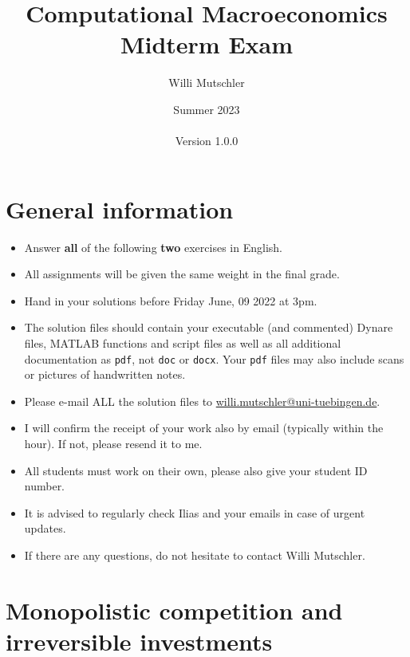 \documentclass{article}
\begin{document}
	
\title{Computational Macroeconomics\\Midterm Exam}
\author{Willi Mutschler}
\date{Summer 2023\\~\\Version 1.0.0}
\maketitle

\section*{General information}
\begin{itemize}
\item Answer \textbf{all} of the following \textbf{two} exercises in English.
\item All assignments will be given the same weight in the final grade.
\item Hand in your solutions before Friday June, 09 2022 at 3pm.
\item The solution files should contain your executable (and commented) Dynare files, MATLAB functions and script files
  as well as all additional documentation as \texttt{pdf}, not \texttt{doc} or \texttt{docx}.
Your \texttt{pdf} files may also include scans or pictures of handwritten notes.
\item Please e-mail ALL the solution files to \url{willi.mutschler@uni-tuebingen.de}.
\item I will confirm the receipt of your work also by email (typically within the hour). If not, please resend it to me.
\item All students must work on their own, please also give your student ID number.
\item It is advised to regularly check Ilias and your emails in case of urgent updates.
\item If there are any questions, do not hesitate to contact Willi Mutschler.
\end{itemize}


\newpage

\section[Monopolistic competition and irreversible investments]{Monopolistic competition and irreversible investments\label{ex:RBCModelMonCompIrrInvest}}
\end{document}
